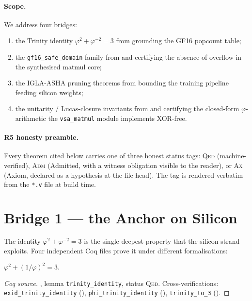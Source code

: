 \paragraph{Scope.}
We address four bridges:
\begin{enumerate}
  \item the Trinity identity $\varphi^2 + \varphi^{-2} = 3$ from
         grounding the GF16 popcount table;
  \item the \texttt{gf16\_safe\_domain} family from
         and
        certifying the absence of overflow in the synthesised matmul core;
  \item the IGLA-ASHA pruning theorems from
         bounding the training pipeline
        feeding silicon weights;
  \item the unitarity / Lucas-closure invariants from
         and
        certifying the closed-form $\varphi$-arithmetic the
        \texttt{vsa\_matmul} module implements XOR-free.
\end{enumerate}

\paragraph{R5 honesty preamble.}
Every theorem cited below carries one of three honest status tags:
\textsc{Qed} (machine-verified),
\textsc{Adm} (Admitted, with a witness obligation visible to the reader), or
\textsc{Ax} (Axiom, declared as a hypothesis at the file head).
The tag is rendered verbatim from the \texttt{*.v} file at build time.

\section{Bridge 1 --- the Anchor on Silicon}

The identity $\varphi^2 + \varphi^{-2} = 3$ is the single deepest property
that the silicon strand exploits.
Four independent Coq files prove it under different formalisations:

\begin{theorem}
\label{thm:sil-anchor}
$\varphi^2 + (1/\varphi)^2 = 3$.
\end{theorem}
\begin{proof}[Coq source]
, lemma \texttt{trinity\_identity}, status \textsc{Qed}.
Cross-verifications: \texttt{exid\_trinity\_identity} (),
\texttt{phi\_trinity\_identity} (),
\texttt{trinity\_to\_3} ().
\end{proof}


